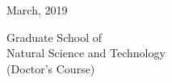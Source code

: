 \documentclass[
12pt, %
english, %
singlespacing, %
liststotoc, %
toctotoc, %
parskip, %
headsepline, %
consistentlayout, %
]{MastersDoctoralThesis} %
\author{Md. Al-Amin \textsc{Khandaker}} %
\begin{document}
\frontmatter %

\pagestyle{plain} %


\begin{titlepage}
	\begin{center}
		
		\vspace*{30mm}
		
		\LARGE \ttitle
		
		\vspace{5mm}
		\vspace{55mm}
		
		March, 2019
		
		\vspace{15mm}
		
		\authorname
		\vspace{15mm}
		
	 Graduate School of \\
		Natural Science and Technology \\
		(Doctor's Course)
		
		\vspace{10mm}
		
			{\scshape \LARGE \univname}
	\end{center}
\end{titlepage}
\clearpage

\end{document}
